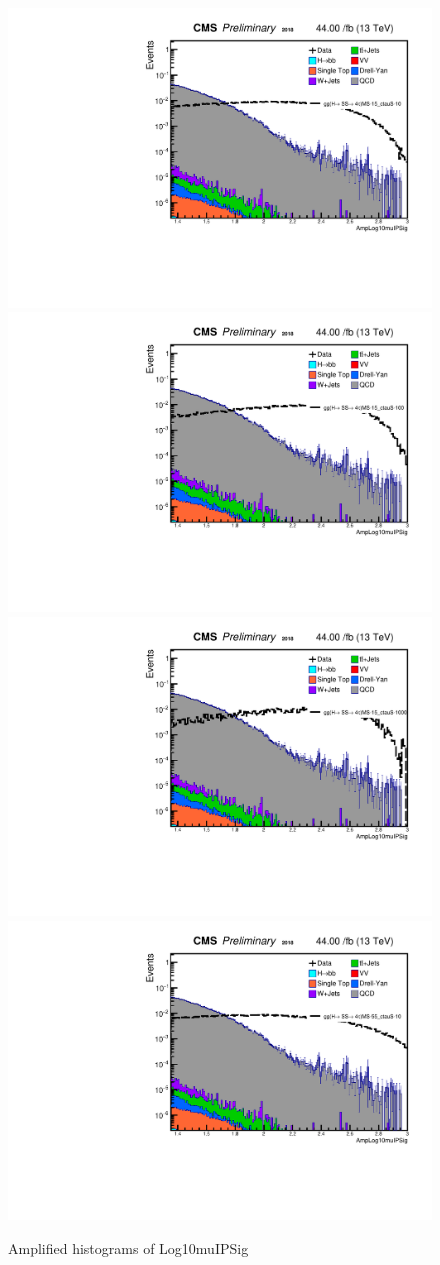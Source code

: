  \begin{figure}[h!]
   \label{fig:AmpleadmuIP}
   \centering
   \includegraphics[width=0.47\linewidth]{figs/log_Oct6ANVars_MS-15_ctauS-10_AmpLog10muIPSig.pdf}
   \includegraphics[width=0.47\linewidth]{figs/log_Oct6ANVars_MS-15_ctauS-100_AmpLog10muIPSig.pdf}
   \includegraphics[width=0.47\linewidth]{figs/log_Oct6ANVars_MS-15_ctauS-1000_AmpLog10muIPSig.pdf}
   \includegraphics[width=0.47\linewidth]{figs/log_Oct6ANVars_MS-55_ctauS-10_AmpLog10muIPSig.pdf}
   \caption{Amplified histograms of Log10muIPSig}
 \end{figure}


